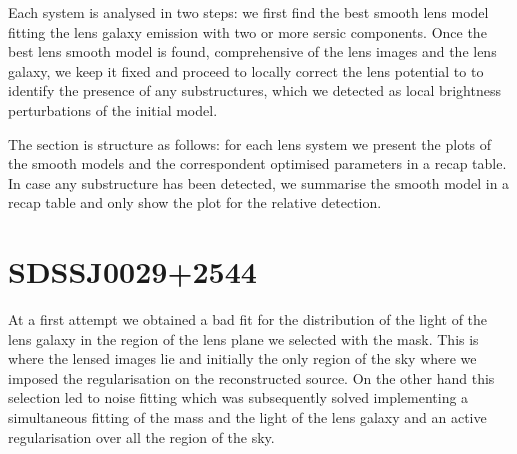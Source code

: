 \documentclass[a4paper,fleqn,usenatbib]{mnras}
\begin{document}
Each system is analysed in two steps: we first find the best smooth lens model fitting the lens galaxy emission with two or more sersic components. Once the best lens smooth model is found, comprehensive of the lens images and the lens galaxy, we keep it fixed and proceed to locally correct the lens potential to to identify the presence of any substructures, which we detected as local brightness perturbations of the initial model.

The section is structure as follows: for each lens system we present the plots of the smooth models and the correspondent optimised parameters in a recap table. In case any substructure has been detected, we summarise the smooth model in a recap table and only show the plot for the relative detection.

\onecolumn
\section{SDSSJ0029+2544}
At a first attempt we obtained a bad fit for the distribution of the light of the lens galaxy in the region of the lens plane we selected with the mask. This is where the lensed images lie and initially the only region of the sky where we imposed the regularisation on the reconstructed source. On the other hand this selection led to noise fitting which was subsequently solved implementing a simultaneous fitting of the mass and the light of the lens galaxy and an active regularisation over all the region of the sky.

\begin{table}
\end{table}
\end{document}
